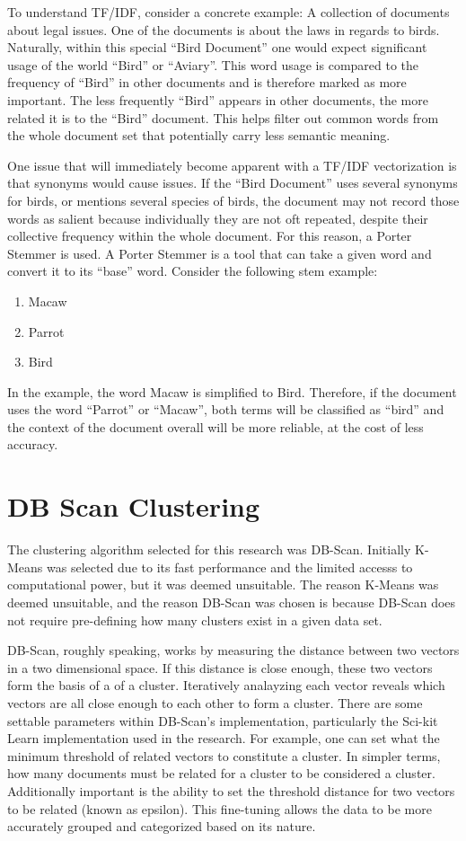 To understand TF/IDF, consider a concrete example: A collection of
documents about legal issues. One of the documents is about the laws
in regards to birds. Naturally, within this special ``Bird Document''
one would expect significant usage of the world ``Bird'' or
``Aviary''. This word usage is compared to the frequency of ``Bird''
in other documents and is therefore marked as more important. The less
frequently ``Bird'' appears in other documents, the more related it is
to the ``Bird'' document. This helps filter out common words from the
whole document set that potentially carry less semantic meaning.

One issue that will immediately become apparent with a TF/IDF
vectorization is that synonyms would cause issues. If the ``Bird
Document'' uses several synonyms for birds, or mentions several
species of birds, the document may not record those words as salient
because individually they are not oft repeated, despite their
collective frequency within the whole document. For this reason,
a Porter Stemmer is used. A Porter Stemmer is a tool that can take
a given word and convert it to its ``base'' word. Consider the following
stem example:

\begin{enumerate}
\item Macaw
\item Parrot
\item Bird
\end{enumerate}

In the example, the word Macaw is simplified to Bird. Therefore, if
the document uses the word ``Parrot'' or ``Macaw'', both terms will be
classified as ``bird'' and the context of the document overall will be
more reliable, at the cost of less accuracy.

\section{DB Scan Clustering}
The clustering algorithm selected for this research was
DB-Scan. Initially K-Means was selected due to its fast performance
and the limited accesss to computational power, but it was deemed
unsuitable. The reason K-Means was deemed unsuitable, and the reason
DB-Scan was chosen is because DB-Scan does not require pre-defining
how many clusters exist in a given data set.

DB-Scan, roughly speaking, works by measuring the distance between two
vectors in a two dimensional space. If this distance is close enough,
these two vectors form the basis of a of a cluster. Iteratively
analayzing each vector reveals which vectors are all close enough to
each other to form a cluster. There are some settable parameters
within DB-Scan's implementation, particularly the Sci-kit Learn
implementation used in the research. For example, one can set what the
minimum threshold of related vectors to constitute a cluster. In
simpler terms, how many documents must be related for a cluster to be
considered a cluster. Additionally important is the ability to set the
threshold distance for two vectors to be related (known as
epsilon). This fine-tuning allows the data to be more accurately
grouped and categorized based on its nature.

